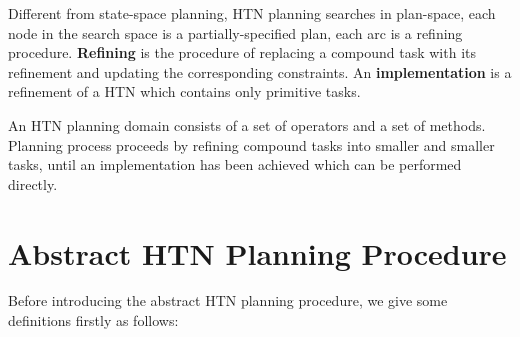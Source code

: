 Different from state-space planning, HTN planning searches in plan-space, each node in the search space is a partially-specified plan, each arc is a refining procedure. \textbf{Refining} is the procedure of replacing a compound task with its refinement and updating the corresponding constraints. An \textbf{implementation} is a refinement of a HTN which contains only primitive tasks.

An HTN planning domain consists of a set of operators and a set of methods. Planning process proceeds by refining compound tasks into smaller and smaller tasks, until an implementation has been achieved which can be performed directly.






\section{Abstract HTN Planning Procedure}
Before introducing the abstract HTN planning procedure, we give some definitions firstly as follows:

